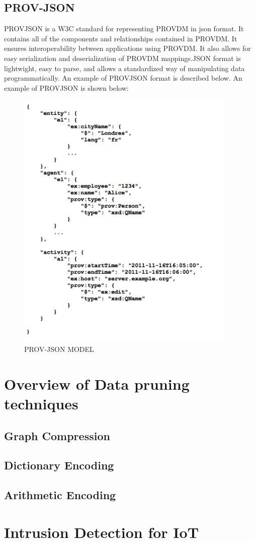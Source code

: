 \subsection{PROV-JSON}

PROV\-JSON is a W3C standard for representing PROV\-DM in json format. It contains all of the components and relationships contained in PROV\-DM. It ensures interoperability between applications using PROV\-DM. It also allows for easy serialization and deserialization of PROV\-DM mappings.JSON format is lightwight, easy to parse, and allows a standardized way of manipulating data programmatically. An example of PROV\-JSON format is described below.  An example of PROV\-JSON is shown below:

\begin{figure}[h]
\begin{center}

\includegraphics[height=5in]{prov_json.png}
\end{center}
\caption{PROV-JSON MODEL}

\end{figure}

\section{Overview of Data pruning techniques}

\subsection{Graph Compression}

\subsection{Dictionary Encoding}

\subsection{Arithmetic Encoding}


\section{Intrusion Detection for IoT}



